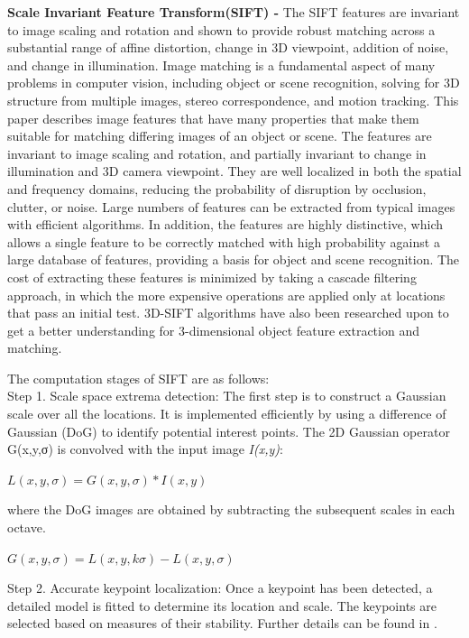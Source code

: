 \textbf{Scale Invariant Feature Transform(SIFT) - } The SIFT features are invariant to image scaling and rotation and shown to provide robust matching across a substantial range of affine distortion, change in 3D viewpoint, addition of noise, and change in illumination. Image matching is a fundamental aspect of many problems in computer vision, including object or scene recognition, solving for 3D structure from multiple images, stereo correspondence, and motion tracking. This paper describes image features that have many properties that make them suitable for matching differing images of an object or scene. The features are invariant to image scaling and rotation, and partially invariant to change in illumination and 3D camera viewpoint. They are well localized in both the spatial and frequency domains, reducing the probability of disruption by occlusion, clutter, or noise. Large numbers of features can be extracted from typical images with efficient algorithms. In addition, the features are highly distinctive, which allows a single feature to be correctly matched with high probability against a large database of features, providing a basis for object and scene recognition.
The cost of extracting these features is minimized by taking a cascade filtering approach, in which the more expensive operations are applied only at locations that pass an initial test. 3D-SIFT \cite{3dsift} algorithms have also been researched upon to get a better understanding for 3-dimensional object feature extraction and matching.

 The computation stages of SIFT are as follows: \\
Step 1. Scale space extrema detection: The first step is to construct a Gaussian scale over all the locations. It is implemented efficiently by using a difference of Gaussian (DoG) to identify potential interest points. The 2D Gaussian operator G(x,y,σ) is convolved with the input image \textit{I(x,y)}:
\begin{center}
	$L(x,y,\sigma) = G(x,y,\sigma) * I(x,y)$
\end{center}
where the  DoG images are obtained by subtracting the subsequent scales in each octave.
\begin{center}
	$G(x,y,\sigma) = L(x,y,k\sigma) - L(x,y,\sigma)$
\end{center}

Step 2. Accurate keypoint localization: Once a keypoint has been detected, a detailed model is fitted to determine its location and scale. The keypoints are selected based on measures of their stability. Further details can be found in \cite{alonso2009iris}. 

